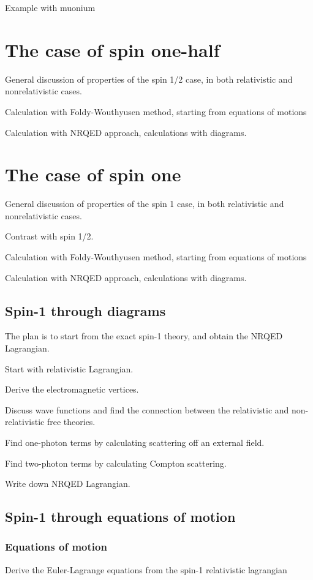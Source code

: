 \documentclass[12pt]{article}
\begin{document}
Example with muonium


\section{The case of spin one-half}
General discussion of properties of the spin 1/2 case, in both relativistic and nonrelativistic cases.

Calculation with Foldy-Wouthyusen method, starting from equations of motions

Calculation with NRQED approach, calculations with diagrams.

\section{The case of spin one}
General discussion of properties of the spin 1 case, in both relativistic and nonrelativistic cases.

Contrast with spin 1/2.

Calculation with Foldy-Wouthyusen method, starting from equations of motions


Calculation with NRQED approach, calculations with diagrams.


\subsection{Spin-1 through diagrams}
The plan is to start from the exact spin-1 theory, and obtain the NRQED Lagrangian.

Start with relativistic Lagrangian.

Derive the electromagnetic vertices.

Discuss wave functions and find the connection between the relativistic and non-relativistic free theories.

Find one-photon terms by calculating scattering off an external field.

Find two-photon terms by calculating Compton scattering.

Write down NRQED Lagrangian.

\subsection{Spin-1 through equations of motion}

\subsubsection{Equations of motion}
Derive the Euler-Lagrange equations from the spin-1 relativistic lagrangian
\end{document}
